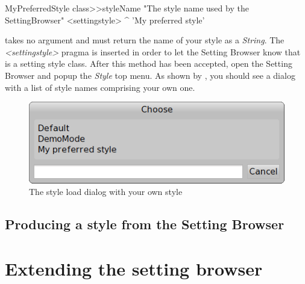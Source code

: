 \documentclass[a4paper,10pt,twoside]{book}
\begin{document}
{\begin{code}{}
MyPreferredStyle class>>styleName
	"The style name used by the SettingBrowser"
	<settingstyle>
	^ 'My preferred style'
\end{code}
 takes no argument and must return the name of your style as a \textit{String}.
The \textit{<settingstyle>} pragma is inserted in order to let the Setting Browser know that  is a setting style class.
After this method has been accepted, open the Setting Browser and popup the \textit{Style} top menu. As shown by , you should see a dialog with a list of style names comprising your own one.

\begin{figure}[tbh]
\begin{center}
\includegraphics[scale=0.4]{setting-style-load-dialog}
\caption{The style load dialog with your own style}
\end{center}
\end{figure}

\subsection{Producing a style from the Setting Browser}

\section{Extending the setting browser}
\label{sec:ExtendingTheSettingsBrowser}

}
\end{document}
